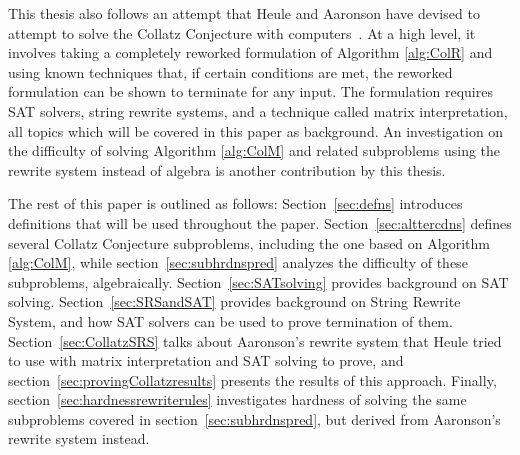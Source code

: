 \documentclass[12pt]{article}
\theoremstyle{definition}
\begin{document}
This thesis also follows an attempt that Heule and Aaronson have devised to attempt to solve the Collatz Conjecture with computers~\cite{HeuleAaronson}. At a high level, it involves taking a completely reworked formulation of Algorithm \ref{alg:ColR} and using known techniques that, if certain conditions are met, the reworked formulation can be shown to terminate for any input. The formulation requires SAT solvers, string rewrite systems, and a technique called matrix interpretation, all topics which will be covered in this paper as background. An investigation on the difficulty of solving Algorithm \ref{alg:ColM} and related subproblems using the rewrite system instead of algebra is another contribution by this thesis.\par
The rest of this paper is outlined as follows: Section~\ref{sec:defns} introduces definitions that will be used throughout the paper. Section~\ref{sec:alttercdns} defines several Collatz Conjecture subproblems, including the one based on Algorithm \ref{alg:ColM}, while section~\ref{sec:subhrdnspred} analyzes the difficulty of these subproblems, algebraically. Section~\ref{sec:SATsolving} provides background on SAT solving. Section~\ref{sec:SRSandSAT} provides background on String Rewrite System, and how SAT solvers can be used to prove termination of them. Section~\ref{sec:CollatzSRS} talks about Aaronson's rewrite system that Heule tried to use with matrix interpretation and SAT solving to prove, and section~\ref{sec:provingCollatzresults} presents the results of this approach. Finally, section~\ref{sec:hardnessrewriterules} investigates hardness of solving the same subproblems covered in section~\ref{sec:subhrdnspred}, but derived from Aaronson's rewrite system instead.
\end{document}
